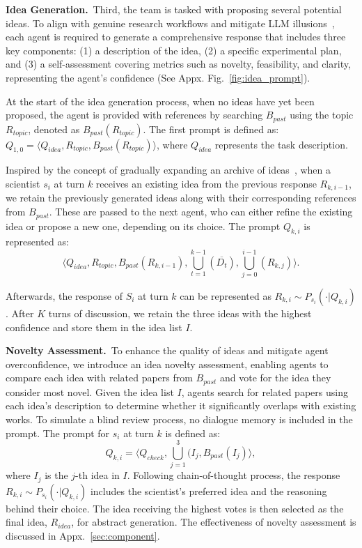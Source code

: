 \documentclass[11pt]{article}
\begin{document}
\noindent \textbf{Idea Generation.}~Third, the team is tasked with proposing several potential ideas. To align with genuine research workflows and mitigate LLM illusions~\citep{huang2023survey}, each agent is required to generate a comprehensive response that includes three key components: (1) a description of the idea, (2) a specific experimental plan, and (3) a self-assessment covering metrics such as novelty, feasibility, and clarity, representing the agent’s confidence (See Appx. Fig.~\ref{fig:idea_prompt}).

At the start of the idea generation process, when no ideas have yet been proposed, the agent is provided with references by searching $B_{past}$ using the topic $R_{topic}$, denoted as $B_{past}(R_{topic})$. The first prompt is defined as: $Q_{1,0}=\langle Q_{idea},R_{topic},B_{past}(R_{topic})\rangle$,
where $Q_{idea}$ represents the task description. 

Inspired by the concept of gradually expanding an archive of ideas~\citep{zhang2023exploring,lu2024ai}, when a scientist $s_{i}$ at turn $k$ receives an existing idea from the previous response $R_{k,i-1}$, we retain the previously generated ideas along with their corresponding references from $B_{past}$. These are passed to the next agent, who can either refine the existing idea or propose a new one, depending on its choice. The prompt $Q_{k,i}$ is represented as:
\begin{equation}
    \langle Q_{idea},R_{topic}, B_{past}(R_{k,i-1}), \overset{k-1}{\underset{t=1}{\bigcup}}(\overline{D_{t}}), \overset{i-1}{\underset{j=0}{\bigcup}}(R_{k,j})\rangle.
\end{equation}

Afterwards, the response of $S_i$ at turn $k$ can be represented as $R_{k,i}\sim P_{s_{i}}(\cdot|Q_{k,i})$. After $K$ turns of discussion, we retain the three ideas with the highest confidence and store them in the idea list $I$.

\noindent \textbf{Novelty Assessment.}~To enhance the quality of ideas and mitigate agent overconfidence, we introduce an idea novelty assessment, enabling agents to compare each idea with related papers from $B_{past}$ and vote for the idea they consider most novel. Given the idea list $I$, agents search for related papers using each idea's description to determine whether it significantly overlaps with existing works. To simulate a blind review process, no dialogue memory is included in the prompt. The prompt for $s_{i}$ at turn $k$ is defined as:
\begin{equation}
    Q_{k,i}=\langle Q_{check},\overset{3}{\underset{j=1}{\bigcup}}(I_{j},B_{past}(I_{j})\rangle,
\end{equation}
where $I_{j}$ is the $j$-th idea in $I$. Following chain-of-thought process, the response $R_{k,i}\sim P_{s_{i}}(\cdot|Q_{k,i})$ includes the scientist’s preferred idea and the reasoning behind their choice. The idea receiving the highest votes is then selected as the final idea, $R_{idea}$, for abstract generation. The effectiveness of novelty assessment is discussed in Appx.~\ref{sec:component}.
\end{document}

